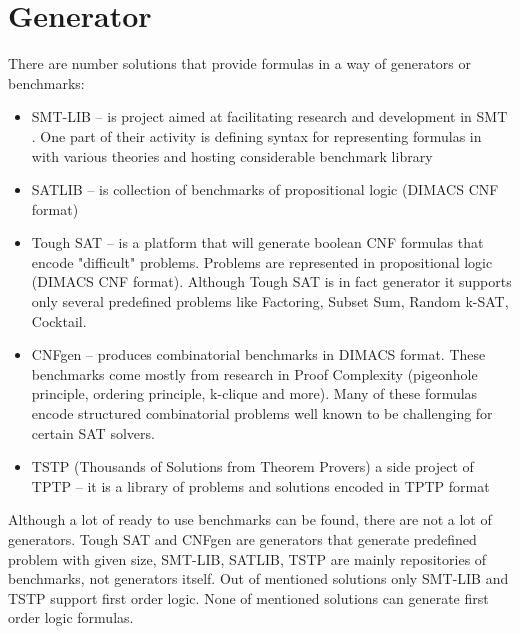 \chapter{Generator}
\label{chap:Generator}

There are number solutions that provide formulas in a way of generators or benchmarks:

\begin{itemize}
  \item SMT-LIB \cite{BarFT-RR-17} -- is project aimed at facilitating research and development in \gls{SMT} . One part of their activity is defining syntax for representing formulas in with various theories and hosting considerable benchmark library
  \item SATLIB \cite{Hol00} -- is collection of benchmarks of propositional logic (DIMACS CNF format)
  \item Tough SAT \cite{ToughSAT} -- is a platform that will generate boolean CNF formulas that encode "difficult" problems. Problems are represented in propositional logic (DIMACS CNF format). Although Tough SAT is in fact generator it supports only several predefined problems like Factoring, Subset Sum, Random k-SAT, Cocktail.
  \item CNFgen \cite{CNFGen} -- produces combinatorial benchmarks in DIMACS format. These benchmarks come mostly from research in Proof Complexity (pigeonhole principle, ordering principle, k-clique and more). Many of these formulas encode structured combinatorial problems well known to be challenging for certain SAT solvers.
  \item \gls{TSTP} (Thousands of Solutions from Theorem Provers) a side project of \gls{TPTP} \cite{Sut17} -- it is a library of problems and solutions encoded in TPTP format
\end{itemize}

Although a lot of ready to use benchmarks can be found, there are not a lot of generators. Tough SAT and CNFgen are generators that generate predefined problem with given size, SMT-LIB, SATLIB, TSTP are mainly repositories of benchmarks, not generators itself. Out of mentioned solutions only SMT-LIB and TSTP support first order logic. None of mentioned solutions can generate first order logic formulas. 

